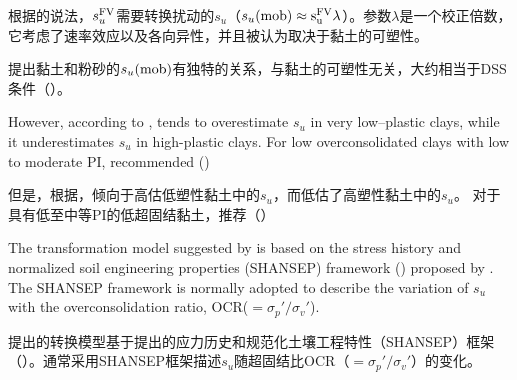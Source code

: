 \begin{ParaColumn}
    \switchcolumn

    根据\citet{Bjerrum19721}的说法，$s_u^{\rm{FV}}$需要转换扰动的$s_u$（$s_u(\rm{mob})\approx{}s_u^{\rm{FV}}\lambda$）。参数$\lambda$是一个校正倍数，它考虑了速率效应以及各向异性，并且被认为取决于黏土的可塑性。
    
    \citet{Mesri1975409,Mesri1989162}提出黏土和粉砂的$s_u(\rm{mob})$有独特的关系，与黏土的可塑性无关，大约相当于DSS条件（）。

    \switchcolumn*
    
    However, according to \citet{Larsson1980591},  tends to overestimate $s_u$ in very low–plastic clays, while it underestimates $s_u$ in high-plastic clays. For low overconsolidated clays with low to moderate PI, \citet{Jamiolkowski198557}recommended ()

    \switchcolumn

    但是，根据\citet{Larsson1980591}，倾向于高估低塑性黏土中的$s_u$，而低估了高塑性黏土中的$s_u$。 对于具有低至中等PI的低超固结黏土，\citet{Jamiolkowski198557}推荐（）

    \switchcolumn*
    
    The transformation model suggested by \citet{Jamiolkowski198557} is based on the stress history and normalized soil engineering properties (SHANSEP) framework () proposed by \citet{Ladd1974763}. The SHANSEP framework is normally adopted to describe the variation of $s_u$ with the overconsolidation ratio, OCR($=\sigma_p'/\sigma_v'$).

    \switchcolumn

    \citet{Jamiolkowski198557}提出的转换模型基于\citet{Ladd1974763}提出的应力历史和规范化土壤工程特性（SHANSEP）框架（）。通常采用SHANSEP框架描述$s_u$随超固结比OCR（$=\sigma_p'/\sigma_v'$）的变化。

    \switchcolumn*


\end{ParaColumn}
